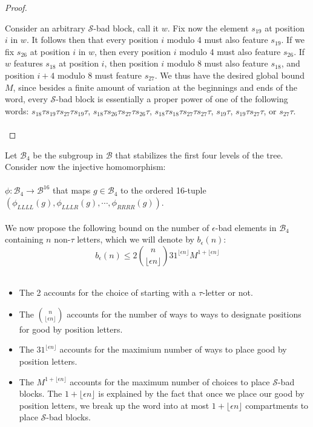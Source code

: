 \documentclass[11pt]{amsart}
\theoremstyle{definition}
\theoremstyle{remark}
\numberwithin{equation}{section}
\begin{document}
\begin{proof}
\begin{enumerate}
\end{enumerate} 
Consider an arbitrary $\mathcal{S}$-bad block, call it $w$. Fix now the element $s_{19}$ at position $i$ in $w$. It follows then that every position $i$ modulo 4 must also feature $s_{19}$. If we fix $s_{26}$ at position $i$ in $w$, then every position $i$ modulo 4 must also feature $s_{26}$. If $w$ features $s_{18}$ at position $i$, then position $i$ modulo 8 must also feature $s_{18}$, and position $i + 4$ modulo 8 must feature $s_{27}$. We thus have the desired global bound $M$, since besides a finite amount of variation at the beginnings and ends of the word, every $\mathcal{S}$-bad block is essentially a proper power of one of the following words: $s_{18} \tau s_{19} \tau s_{27} \tau s_{19} \tau$, $s_{18} \tau s_{26} \tau s_{27} \tau s_{26} \tau$, $s_{18} \tau s_{18} \tau s_{27} \tau s_{27} \tau$, $s_{19} \tau$, $s_{19} \tau s_{27} \tau$, or $s_{27} \tau$. \\ \\
\end{proof}

\noindent Let $\mathcal{B}_4$ be the subgroup in $\mathcal{B}$ that stabilizes the first four levels of the tree. Consider now the injective homomorphism: \\ \\
$ \phi \colon \mathcal{B}_4 \to \mathcal{B}^{16}$ that maps $g \in \mathcal{B}_4$ to the ordered 16-tuple $(\phi_{LLLL}(g), \phi_{LLLR}(g), \cdots, \phi_{RRRR}(g))$. \\ \\
We now propose the following bound on the number of $\epsilon$-bad elements in $\mathcal{B}_4$ containing $n$ non-$\tau$ letters, which we will denote by $b_{\epsilon}(n)$: \\
$$b_{\epsilon}(n) \leq 2 \displaystyle{ n \choose \lfloor \epsilon n \rfloor } 31^{ \lfloor \epsilon n \rfloor } M^{1 + \lfloor \epsilon n \rfloor} $$ \\
\begin{itemize}
\item The 2 accounts for the choice of starting with a $\tau$-letter or not. \\
\item The $\displaystyle{ n \choose \lfloor \epsilon n \rfloor }$ accounts for the number of ways to ways to designate positions for good by position letters. \\
\item The $31^{ \lfloor \epsilon n \rfloor }$ accounts for the maximium number of ways to place good by position letters. \\
\item The $M^{1 + \lfloor \epsilon n \rfloor}$ accounts for the maximum number of choices to place $\mathcal{S}$-bad blocks. The $1 + \lfloor \epsilon n \rfloor$ is explained by the fact that once we place our good by position letters, we break up the word into at most $1 + \lfloor \epsilon n \rfloor$ compartments to place $\mathcal{S}$-bad blocks. \\
\end{itemize}
\end{document}
